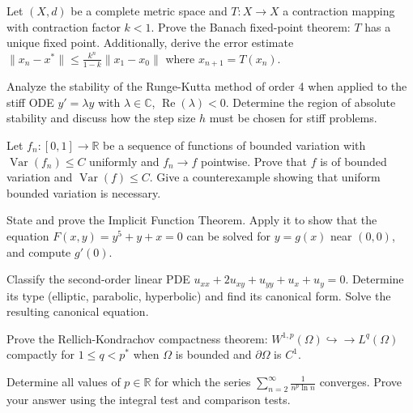\documentclass[12pt,a4paper]{exam}
\begin{document}
\begin{questions}

\question[4]
Let $(X, d)$ be a complete metric space and $T: X \to X$ a contraction mapping with contraction factor $k < 1$. Prove the Banach fixed-point theorem: $T$ has a unique fixed point. Additionally, derive the error estimate $\|x_n - x^*\| \leq \frac{k^n}{1-k} \|x_1 - x_0\|$ where $x_{n+1} = T(x_n)$.

\vspace{0.3cm}

\question[3]
Analyze the stability of the Runge-Kutta method of order 4 when applied to the stiff ODE $y' = \lambda y$ with $\lambda \in \mathbb{C}$, $\operatorname{Re}(\lambda) < 0$. Determine the region of absolute stability and discuss how the step size $h$ must be chosen for stiff problems.

\vspace{0.3cm}

\question[5]
Let $f_n: [0,1] \to \mathbb{R}$ be a sequence of functions of bounded variation with $\operatorname{Var}(f_n) \leq C$ uniformly and $f_n \to f$ pointwise. Prove that $f$ is of bounded variation and $\operatorname{Var}(f) \leq C$. Give a counterexample showing that uniform bounded variation is necessary.

\vspace{0.3cm}

\question[4]
State and prove the Implicit Function Theorem. Apply it to show that the equation $F(x,y) = y^5 + y + x = 0$ can be solved for $y = g(x)$ near $(0,0)$, and compute $g'(0)$.

\vspace{0.3cm}

\question[7]
Classify the second-order linear PDE $u_{xx} + 2u_{xy} + u_{yy} + u_x + u_y = 0$. Determine its type (elliptic, parabolic, hyperbolic) and find its canonical form. Solve the resulting canonical equation.

\vspace{0.3cm}

\question[4]
Prove the Rellich-Kondrachov compactness theorem: $W^{1,p}(\Omega) \hookrightarrow\!\!\!\to L^q(\Omega)$ compactly for $1 \leq q < p^*$ when $\Omega$ is bounded and $\partial\Omega$ is $C^1$.

\vspace{0.3cm}

\question[5]
Determine all values of $p \in \mathbb{R}$ for which the series $\sum_{n=2}^{\infty} \frac{1}{n^p \ln n}$ converges. Prove your answer using the integral test and comparison tests.


\end{questions}
\end{document}
